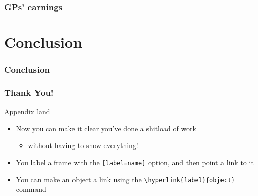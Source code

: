 \documentclass[12pt, aspectratio=169]{beamer}
\begin{document}

\begin{frame}
\frametitle{GPs' earnings}

\centerline{
}

\end{frame}


\section{Conclusion}

\begin{frame}
\frametitle{Conclusion}
\end{frame}


\begin{frame}
\frametitle{Thank You!}
\end{frame}


\appendix
\begin{frame}[label=appendix_end]{Appendix land}
  \begin{itemize}
    \item[] Now you can make it clear you've done a shitload of work
      \begin{itemize}
      \item[]  without having to show everything! \hyperlink{data_slide}{}
      \end{itemize}
    \item[] You label a frame with the \texttt{[label=name]} option, and then point a link to it
    \item[] You can make an object a link using the \texttt{\textbackslash hyperlink\{label\}\{object\}} command
  \end{itemize}
\end{frame}
\end{document}
